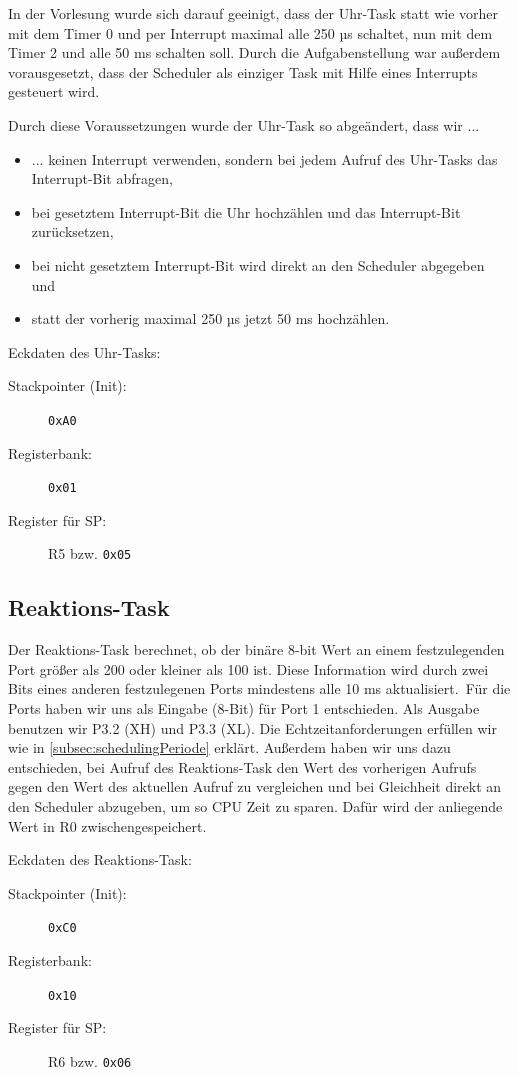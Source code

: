 In der Vorlesung wurde sich darauf geeinigt, dass der Uhr-Task statt wie vorher mit dem Timer 0 und per Interrupt maximal alle 250 µs schaltet, nun mit dem Timer 2 und alle 50 ms schalten soll.
Durch die Aufgabenstellung war außerdem vorausgesetzt, dass der Scheduler \glqq als einziger Task mit Hilfe eines Interrupts gesteuert wird.\grqq

Durch diese Voraussetzungen wurde der Uhr-Task so abgeändert, dass wir ...
\begin{itemize}
    \item ... keinen Interrupt verwenden, sondern bei jedem Aufruf des Uhr-Tasks das Interrupt-Bit abfragen,
    \item bei gesetztem Interrupt-Bit die Uhr hochzählen und das Interrupt-Bit zurücksetzen,
    \item bei nicht gesetztem Interrupt-Bit wird direkt an den Scheduler abgegeben und
    \item statt der vorherig maximal 250 µs jetzt 50 ms hochzählen.
\end{itemize}
Eckdaten des Uhr-Tasks:
\begin{description}
    \item[Stackpointer (Init):] \verb|0xA0|
    \item[Registerbank:] \verb|0x01| 
    \item[Register für SP:] R5 bzw. \verb|0x05| 
\end{description}

\subsection{Reaktions-Task}
Der Reaktions-Task \glqq berechnet, ob der binäre 8-bit Wert an einem festzulegenden Port größer als 200 oder kleiner als 100 ist. Diese Information wird durch zwei Bits eines anderen festzulegenen Ports mindestens alle 10 ms aktualisiert.\grqq\ 
Für die Ports haben wir uns als Eingabe (8-Bit) für Port 1 entschieden.
Als Ausgabe benutzen wir P3.2 (XH) und P3.3 (XL).
Die Echtzeitanforderungen erfüllen wir wie in \autoref{subsec:schedulingPeriode} erklärt.
Außerdem haben wir uns dazu entschieden, bei Aufruf des Reaktions-Task den Wert des vorherigen Aufrufs gegen den Wert des aktuellen Aufruf zu vergleichen und bei Gleichheit direkt an den Scheduler abzugeben, um so CPU Zeit zu sparen.
Dafür wird der anliegende Wert in R0 zwischengespeichert.

Eckdaten des Reaktions-Task:
\begin{description}
    \item[Stackpointer (Init):] \verb|0xC0|
    \item[Registerbank:] \verb|0x10| 
    \item[Register für SP:] R6 bzw. \verb|0x06| 
\end{description}

